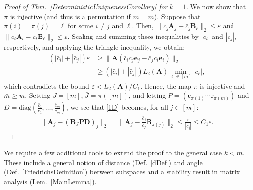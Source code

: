 \documentclass[9pt,twocolumn]{pnas-new}
\newtheorem{remark}{Remark}
\begin{document}
\begin{proof}[Proof of Thm.~\ref{DeterministicUniquenessCorollary} for $k=1$]
We  now show that $\pi$ is injective (and thus is a permutation if $\bar m = m$). Suppose that $\pi(i) = \pi(j) = \ell$ for some $i \neq j$ and $\ell$. Then, $\|c_{j}\mathbf{A}_{j} - \bar{c}_{j}\mathbf{B}_{\ell}\|_2 \leq \varepsilon$ and $\|c_{i}\mathbf{A}_{i} - \bar{c}_{i} \mathbf{B}_{\ell}\|_2  \leq \varepsilon$. Scaling and summing these inequalities by $|\bar{c}_{i}|$ and $|\bar{c}_{j}|$, respectively, and applying the triangle inequality, we obtain:
\begin{align*}%
(|\bar{c}_{i}| + |\bar{c}_{j}|) \varepsilon
&\geq\|\mathbf{A}(\bar{c}_{i}c_{j} \mathbf{e}_{j} - \bar{c}_{j}c_{i}\mathbf{e}_{i})\|_2 \nonumber \\ 
&\geq  \left( |\bar{c}_{i}| + |\bar{c}_{j}| \right) L_2(\mathbf{A}) \min_{\ell \in [m]} |c_\ell |,
\end{align*}
%
which contradicts the bound $\varepsilon < L_2(\mathbf{A})/C_1$. Hence, the map $\pi$ is injective and $\bar m \geq m$. Setting $J = [m]$, $\bar J = \pi([m])$, and letting $P = \left( \mathbf{e}_{\pi(1)} \cdots \mathbf{e}_{\pi(m)}\right)$ and $D = \text{diag}(\frac{\bar{c}_1}{c_1},\ldots,\frac{\bar{c}_m}{c_m})$, we see that \eqref{1D} becomes, for all $j \in [m]$:
\begin{align*}%
\|\mathbf{A}_j - (\mathbf{B}_J\mathbf{PD})_j\|_2 
= \|\mathbf{A}_j - \frac{\bar{c}_j}{c_j}\mathbf{B}_{\pi(j)}\|_2 
\leq \frac{\varepsilon}{|c_j|} 
\leq C_1\varepsilon.
\end{align*}
\end{proof}



We require a few additional tools to extend the proof to the general case $k < m$. These include a general notion of distance (Def.~\ref{dDef}) and angle (Def.~\ref{FriedrichsDefinition}) between subspaces and a stability result in matrix analysis (Lem.~\ref{MainLemma}).
\end{document}
